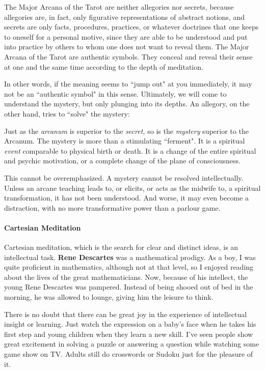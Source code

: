 \begin{quotex}
The Major Arcana of the Tarot are neither allegories nor secrets, because allegories are, in fact, only figurative representations of abstract notions, and secrets are only facts, procedures, practices, or whatever doctrines that one keeps to oneself for a personal motive, since they are able to be understood and put into practice by others to whom one does not want to reveal them. The Major Arcana of the Tarot are authentic symbols. They conceal and reveal their sense at one and the same time according to the depth of meditation. 

\end{quotex}
In other words, if the meaning seems to ``jump out" at you immediately, it may not be an ``authentic symbol" in this sense. Ultimately, we will come to understand the mystery, but only plunging into its depths. An allegory, on the other hand, tries to ``solve" the mystery:

\begin{quotex}
Just as the \emph{arcanum }is superior to the \emph{secret, }so is the \emph{mystery }superior to the Arcanum. The mystery is more than a stimulating ``ferment". It is a spiritual \emph{event }comparable to physical birth or death. It is a change of the entire spiritual and psychic motivation, or a complete change of the plane of consciousness. 

\end{quotex}
This cannot be overemphasized. A mystery cannot be resolved intellectually. Unless an arcane teaching leads to, or elicits, or acts as the midwife to, a spiritual transformation, it has not been understood. And worse, it may even become a distraction, with no more transformative power than a parlour game.

\paragraph{Cartesian Meditation}
Cartesian meditation, which is the search for clear and distinct ideas, is an intellectual task. \textbf{Rene Descartes} was a mathematical prodigy. As a boy, I was quite proficient in mathematics, although not at that level, so I enjoyed reading about the lives of the great mathematicians. Now, because of his intellect, the young Rene Descartes was pampered. Instead of being shooed out of bed in the morning, he was allowed to lounge, giving him the leisure to think.

There is no doubt that there can be great joy in the experience of intellectual insight or learning. Just watch the expression on a baby's face when he takes his first step and young children when they learn a new skill. I've seen people show great excitement in solving a puzzle or answering a question while watching some game show on TV. Adults still do crosswords or Sudoku just for the pleasure of it.

